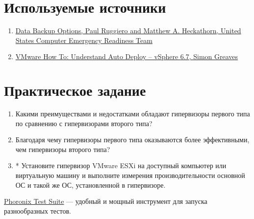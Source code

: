 \documentclass[14pt, a4paper]{article}
\begin{document}
\section*{Используемые источники}

\begin{enumerate}
    \item \href{https://www.us-cert.gov/sites/default/files/publications/data_backup_options.pdf}{Data Backup Options, Paul Ruggiero and Matthew A. Heckathorn, United States Computer
    Emergency Readiness Team}
    \item \href{https://www.simongreaves.co.uk/understand-auto-deploy/}{VMware How To: Understand Auto Deploy – vSphere 6.7, Simon Greaves}
\end{enumerate}

\section*{Практическое задание}

\begin{enumerate}
    \item Какими преимуществами и недостатками обладают гипервизоры первого типа по сравнению с
    гипервизорами второго типа?
    \item Благодаря чему гипервизоры первого типа оказываются более эффективными, чем
    гипервизоры второго типа?
    \item * Установите гипервизор VMware ESXi на доступный компьютер или виртуальную машину и
    выполните измерения производительности основной ОС и такой же ОС, установленной в
    гипервизоре.
\end{enumerate}

\href{https://www.phoronix-test-suite.com/}{Phoronix Test Suite} — удобный и мощный инструмент для запуска разнообразных тестов.
\end{document}
